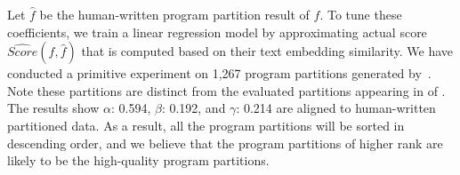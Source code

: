 Let $\hat{f}$ be the human-written program partition result of $f$.
To tune these coefficients,
we train a linear regression model by approximating actual score $\hat{Score}(f, \hat{f})$ that is computed based on their text embedding similarity.
We have conducted a primitive experiment on 1,267 program partitions generated by~\tool.
Note these partitions are distinct from the evaluated partitions appearing in  of .
The results show $\alpha$:
0.594, $\beta$: 0.192, and $\gamma$: 0.214 are aligned to human-written partitioned data. 
As a result, all the program partitions will be sorted in descending order, and we believe that the program partitions of higher rank are likely to be the high-quality program partitions.
